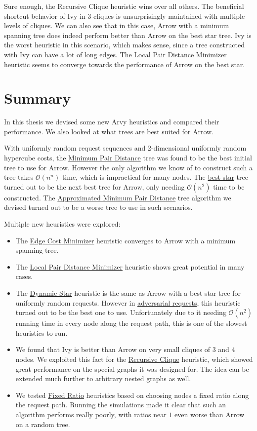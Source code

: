 \documentclass[a4paper, oneside]{discothesis}
\begin{document}
Sure enough, the Recursive Clique heuristic wins over all others. The beneficial shortcut behavior of Ivy in 3-cliques is unsurprisingly maintained with multiple levels of cliques. We can also see that in this case, Arrow with a minimum spanning tree does indeed perform better than Arrow on the best star tree. Ivy is the worst heuristic in this scenario, which makes sense, since a tree constructed with Ivy can have a lot of long edges. The Local Pair Distance Minimizer heuristic seems to converge towards the performance of Arrow on the best star.

\chapter{Summary}

In this thesis we devised some new Arvy heuristics and compared their performance. We also looked at what trees are best suited for Arrow.

With uniformly random request sequences and 2-dimensional uniformly random hypercube costs, the \hyperref[tree:mpd]{Minimum Pair Distance} tree was found to be the best initial tree to use for Arrow. However the only algorithm we know of to construct such a tree takes $\mathcal{O}(n^n)$ time, which is impractical for many nodes. The \hyperref[tree:star]{best star} tree turned out to be the next best tree for Arrow, only needing $\mathcal{O}(n^2)$ time to be constructed. The \hyperref[tree:ampd]{Approximated Minimum Pair Distance} tree algorithm we devised turned out to be a worse tree to use in such scenarios.

Multiple new heuristics were explored:
\begin{itemize}
\item The \hyperref[alg:ecm]{Edge Cost Minimizer} heuristic converges to Arrow with a minimum spanning tree.
\item The \hyperref[alg:lpm]{Local Pair Distance Minimizer} heuristic shows great potential in many cases.
\item The \hyperref[alg:dynstar]{Dynamic Star} heuristic is the same as Arrow with a best star tree for uniformly random requests. However in \hyperref[req:adversary]{adversarial requests}, this heuristic turned out to be the best one to use. Unfortunately due to it needing $\mathcal{O}(n^2)$ running time in every node along the request path, this is one of the slowest heuristics to run.
\item We found that Ivy is better than Arrow on very small cliques of 3 and 4 nodes. We exploited this fact for the \hyperref[alg:reclique]{Recursive Clique} heuristic, which showed great performance on the special graphs it was designed for. The idea can be extended much further to arbitrary nested graphs as well.
\item We tested \hyperref[alg:fr]{Fixed Ratio} heuristics based on choosing nodes a fixed ratio along the request path. Running the simulations made it clear that such an algorithm performs really poorly, with ratios near $1$ even worse than Arrow on a random tree.
\end{itemize}
\end{document}
